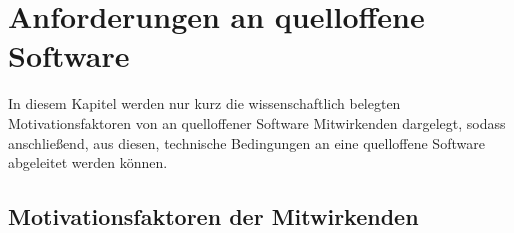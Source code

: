 \section{Anforderungen an quelloffene Software}\label{sec:anforderungen-an-quelloffene-software}

In diesem Kapitel werden nur kurz die wissenschaftlich belegten Motivationsfaktoren von an quelloffener Software Mitwirkenden dargelegt, sodass anschließend, \uA aus diesen, technische Bedingungen an eine quelloffene Software abgeleitet werden können.



\subsection{Motivationsfaktoren der Mitwirkenden}\label{subsec:motivationsfaktoren-der-mitwirkenden}

